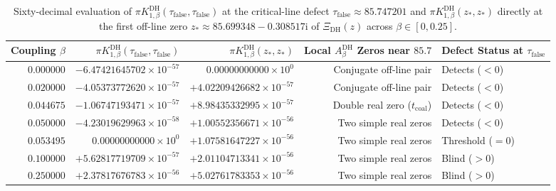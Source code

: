 \documentclass[11pt,reqno]{amsart}
\theoremstyle{definition}
\theoremstyle{remark}
\numberwithin{equation}{section}
\newcommand{\ii}{\mathrm{i}}
\begin{document}
\begin{table}[t]
\centering
\caption{Sixty-decimal evaluation of $\pi K_{1,\beta}^{\mathrm{DH}}(\tau_{\mathrm{false}}, \tau_{\mathrm{false}})$ at the critical-line defect $\tau_{\mathrm{false}} \approx 85.747201$ and $\pi K_{1,\beta}^{\mathrm{DH}}(z_*, z_*)$ directly at the first off-line zero $z_* \approx 85.699348 - 0.308517\ii$ of $\Xi_{\mathrm{DH}}(z)$ across $\beta \in [0, 0.25]$.}\label{tab:dh_blind_spot}
\scriptsize
\setlength{\tabcolsep}{4.0pt}
\begin{tabular}{@{}rrrrl@{}}
\toprule
Coupling $\beta$ & $\pi K_{1,\beta}^{\mathrm{DH}}(\tau_{\mathrm{false}}, \tau_{\mathrm{false}})$ & $\pi K_{1,\beta}^{\mathrm{DH}}(z_*, z_*)$ & Local $A_\beta^{\mathrm{DH}}$ Zeros near $85.7$ & Defect Status at $\tau_{\mathrm{false}}$ \\
\midrule
$0.000000$ & $-6.47421645702\times 10^{-57}$ & $0.00000000000\times 10^{0}$   & Conjugate off-line pair & Detects ($< 0$) \\
$0.020000$ & $-4.05373772620\times 10^{-57}$ & $+4.02209426682\times 10^{-57}$ & Conjugate off-line pair & Detects ($< 0$) \\
$0.044675$ & $-1.06747193471\times 10^{-57}$ & $+8.98435332995\times 10^{-57}$ & Double real zero ($t_{\mathrm{coal}}$) & Detects ($< 0$) \\
$0.050000$ & $-4.23019629963\times 10^{-58}$ & $+1.00552356671\times 10^{-56}$ & Two simple real zeros & Detects ($< 0$) \\
$0.053495$ & $0.00000000000\times 10^{0}$    & $+1.07581647227\times 10^{-56}$ & Two simple real zeros & Threshold ($= 0$) \\
$0.100000$ & $+5.62817719709\times 10^{-57}$ & $+2.01104713341\times 10^{-56}$ & Two simple real zeros & Blind ($> 0$) \\
$0.250000$ & $+2.37817676783\times 10^{-56}$ & $+5.02761783353\times 10^{-56}$ & Two simple real zeros & Blind ($> 0$) \\
\bottomrule
\end{tabular}
\end{table}
\end{document}
